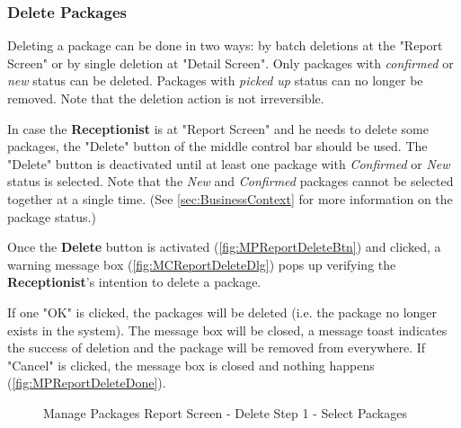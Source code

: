 \subsubsection{Delete Packages}

Deleting a package can be done in two ways: by batch deletions at the "Report Screen" or by single deletion at "Detail Screen". Only packages with \textit{confirmed} or \textit{new} status can be deleted. Packages with \textit{picked up} status can no longer be removed. Note that the deletion action is not irreversible.

In case the \textbf{Receptionist} is at "Report Screen" and he needs to delete some packages, the 
"Delete" button of the middle control bar should be used. The "Delete" button is deactivated until at least one package with \textit{Confirmed} or \textit{New} status is selected. Note that the \textit{New} and \textit{Confirmed} packages cannot be selected together at a single time. (See \autoref{sec:BusinessContext} for more information on the package status.)

Once the \textbf{Delete} button is activated (\autoref{fig:MPReportDeleteBtn}) and clicked, a warning message box (\autoref{fig:MCReportDeleteDlg}) pops up verifying the \textbf{Receptionist}'s intention to delete a package. 

If one "OK" is clicked, the packages will be deleted (i.e. the package no longer exists in the system). The message box will be closed, a message toast indicates the success of deletion and the package will be removed from everywhere. If "Cancel" is clicked, the message box is closed and nothing happens (\autoref{fig:MPReportDeleteDone}). 

\begin{figure}[H]
	\centering

    \caption{Manage Packages Report Screen - Delete Step 1 - Select Packages}
	\label{fig:MPReportDeleteBtn}
\end{figure}

